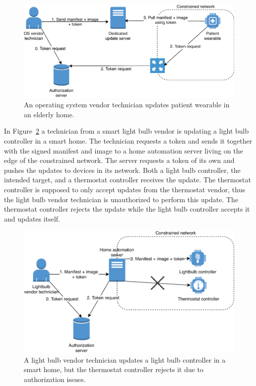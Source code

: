 \documentclass[0-thesis.tex]{subfiles}
\begin{document}
\begin{figure}
    \caption{An operating system vendor technician updates patient wearable in an elderly home.}
    \label{fig:elderly-home}
    \includegraphics{images/use-case-elderly-home.pdf}
\end{figure}

In Figure~\ref{fig:smart-home} a technician from a smart light bulb vendor is updating a
light bulb controller in a smart home. The technician requests a token and sends it
together with the signed manifest and image to a home automation server living on the edge
of the constrained network. The server requests a token of its own and pushes the updates
to devices in its network. Both a light bulb controller, the intended target, and a
thermostat controller receives the update. The thermostat controller is supposed to only
accept updates from the thermostat vendor, thus the light bulb vendor technician is
unauthorized to perform this update. The thermostat controller rejects the update while
the light bulb controller accepts it and updates itself.

\begin{figure}
    \caption{A light bulb vendor technician updates a light bulb controller in a smart
                home, but the thermostat controller rejects it due to authorization
                issues.}
    \label{fig:smart-home}
    \includegraphics{images/use-case-smart-home.pdf}
\end{figure}
\end{document}
